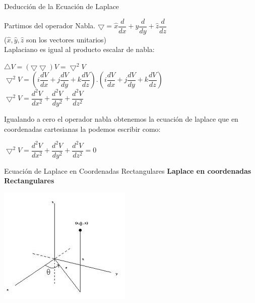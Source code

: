 \documentclass[11pt]{beamer}
\begin{document}
\begin{frame}{Deducción de la Ecuación de Laplace}

Partimos del operador Nabla.
$\displaystyle{\bigtriangledown=\hat{x} \dfrac{d}{dx}+ \hat{y}\dfrac{d}{dy}+\hat{z} \dfrac{d}{dz}}$\\ ($\hat{x},\hat{y},\hat{z}$ son los vectores unitarios)\\
Laplaciano es igual al producto escalar de nabla:
\begin{center}
$\bigtriangleup V = (\bigtriangledown \bigtriangledown)V = \bigtriangledown^{2} V  $\\
$\bigtriangledown^{2} V=(i\dfrac{dV}{dx}+j\dfrac{dV}{dy}+k\dfrac{dV}{dz}).(i\dfrac{dV}{dx}+j\dfrac{dV}{dy}+k\dfrac{dV}{dz})$\\
$\bigtriangledown^{2} V=\dfrac{d^{2}V}{dx^{2}}+\dfrac{d^{2}V}{dy^{2}}+\dfrac{d^{2}V}{dz^{2}}$
\end{center}
Igualando a cero el operador nabla obtenemos la ecuación de laplace que en coordenadas cartesianas la podemos escribir como:
\begin{center}
$\bigtriangledown^{2} V=\dfrac{d^{2}V}{dx^{2}}+\dfrac{d^{2}V}{dy^{2}}+\dfrac{d^{2}V}{dz^{2}}=0$
\end{center}
\end{frame}

\begin{frame}{Ecuación de Laplace en Coordenadas Rectangulares}
\textbf{Laplace en coordenadas Rectangulares}
\begin{center}
\includegraphics[scale=0.7]{rect.jpg} 
\end{center}
\end{frame}
\end{document}
